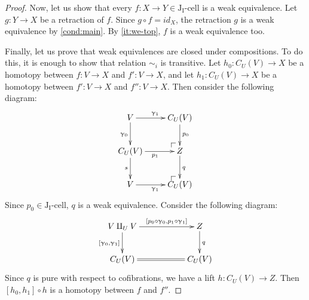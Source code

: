 \documentclass{tac}
\makeatletter
\theoremstyle{definition}
\newcommand{\I}{\mathrm{I}}
\newcommand{\J}{\mathrm{J}}
\newcommand{\class}[2]{#1\text{-}\mathrm{#2}}
\newcommand{\Icell}[1][\I]{\class{#1}{cell}}
\newcommand{\Jcell}[1][]{\Icell[\J#1]}
\newcommand{\cyli}{\upgamma}
\newcommand{\po}[1][dr]{\save*!/#1+1.2pc/#1:(1,-1)@^{|-}\restore}
\makeatother
\begin{document}
\begin{proof}
Now, let us show that every $f : X \to Y \in \Jcell[_\I]$ is a weak equivalence.
Let $g : Y \to X$ be a retraction of $f$.
Since $g \circ f = id_X$, the retraction $g$ is a weak equivalence by \eqref{cond:main}.
By \eqref{it:we-top}, $f$ is a weak equivalence too.

Finally, let us prove that weak equivalences are closed under compositions.
To do this, it is enough to show that relation $\sim_i$ is transitive.
Let $h_0 : C_U(V) \to X$ be a homotopy between $f : V \to X$ and $f' : V \to X$, and
let $h_1 : C_U(V) \to X$ be a homotopy between $f' : V \to X$ and $f'' : V \to X$.
Then consider the following diagram:
\[ \xymatrix{ V \ar[r]^{\cyli_1} \ar[d]_{\cyli_0} & C_U(V) \ar[d]^{p_0} \\
              C_U(V) \ar[r]_{p_1} \ar[d]_s & \po Z \ar[d]^q \\
              V \ar[r]_{\cyli_1} & \po C_U(V)
            } \]
Since $p_0 \in \Jcell[_\I]$, $q$ is a weak equivalence.
Consider the following diagram:
\[ \xymatrix{ V \amalg_U V \ar[rr]^-{[p_0 \circ \cyli_0, p_1 \circ \cyli_1]} \ar[d]_{[\cyli_0,\cyli_1]} & & Z \ar[d]^q \\
              C_U(V) \ar@{=}[rr] & & C_U(V)
            } \]
Since $q$ is pure with respect to cofibrations, we have a lift $h : C_U(V) \to Z$.
Then $[h_0,h_1] \circ h$ is a homotopy between $f$ and $f''$.
\end{proof}
\end{document}
